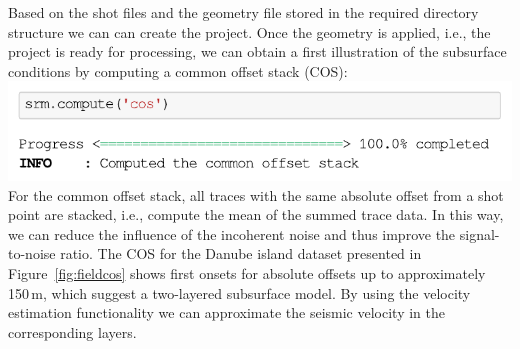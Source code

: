 \documentclass[a4paper,fleqn]{cas-sc}
\begin{document}
Based on the shot files and the geometry file stored in the required directory structure we can can create the project. Once the geometry is applied, i.e., the project is ready for processing, we can obtain a first illustration of the subsurface conditions by computing a common offset stack (COS):
\newline
\includegraphics[width=.5\textwidth]{./figures/plotcos_danube.pdf}
\newline
For the common offset stack, all traces with the same absolute offset from a shot point are stacked, i.e., compute the mean of the summed trace data. In this way, we can reduce the influence of the incoherent noise and thus improve the signal-to-noise ratio. The COS for the Danube island dataset presented in Figure~\ref{fig:fieldcos} shows first onsets for absolute offsets up to approximately 150\,m, which suggest a two-layered subsurface model. By using the velocity estimation functionality we can approximate the seismic velocity in the corresponding layers.
\end{document}
